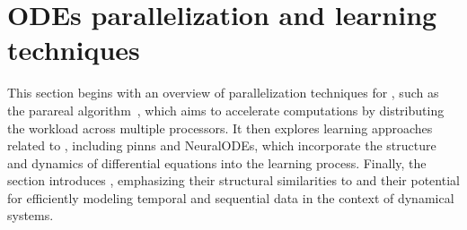     
    
    
    
    

\section{ODEs parallelization and learning techniques}\label{sec:learning_overview}

This section begins with an overview of parallelization techniques for , such as the parareal algorithm~\cite{cParareal}, which aims to accelerate computations by distributing the workload across multiple processors. 
It then explores learning approaches related to , including \gls{pinns} and NeuralODEs, which incorporate the structure and dynamics of differential equations into the learning process. 
Finally, the section introduces , emphasizing their structural similarities to  and their potential for efficiently modeling temporal and sequential data in the context of dynamical systems.

